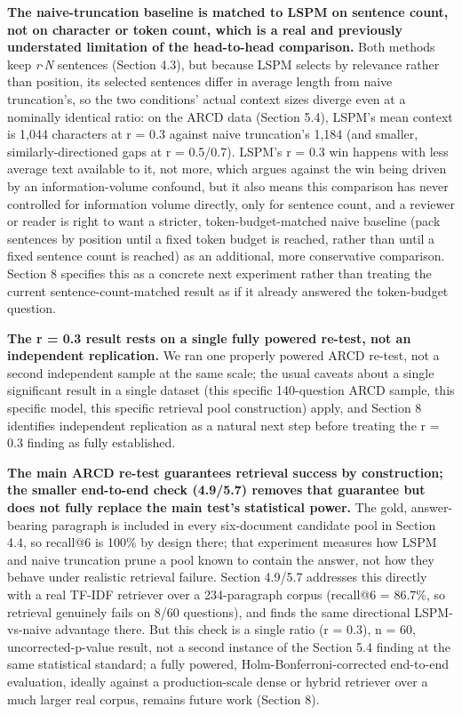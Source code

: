 \textbf{The naive-truncation baseline is matched to LSPM on sentence count, not on character or token count, which is a real and previously understated limitation of the head-to-head comparison.} Both methods keep \textit{r}$\cdot$\textit{N} sentences (Section 4.3), but because LSPM selects by relevance rather than position, its selected sentences differ in average length from naive truncation's, so the two conditions' actual context sizes diverge even at a nominally identical ratio: on the ARCD data (Section 5.4), LSPM's mean context is 1,044 characters at r = 0.3 against naive truncation's 1,184 (and smaller, similarly-directioned gaps at r = 0.5/0.7). LSPM's r = 0.3 win happens with less average text available to it, not more, which argues against the win being driven by an information-volume confound, but it also means this comparison has never controlled for information volume directly, only for sentence count, and a reviewer or reader is right to want a stricter, token-budget-matched naive baseline (pack sentences by position until a fixed token budget is reached, rather than until a fixed sentence count is reached) as an additional, more conservative comparison. Section 8 specifies this as a concrete next experiment rather than treating the current sentence-count-matched result as if it already answered the token-budget question.

\textbf{The r = 0.3 result rests on a single fully powered re-test, not an independent replication.} We ran one properly powered ARCD re-test, not a second independent sample at the same scale; the usual caveats about a single significant result in a single dataset (this specific 140-question ARCD sample, this specific model, this specific retrieval pool construction) apply, and Section 8 identifies independent replication as a natural next step before treating the r = 0.3 finding as fully established.

\textbf{The main ARCD re-test guarantees retrieval success by construction; the smaller end-to-end check (4.9/5.7) removes that guarantee but does not fully replace the main test's statistical power.} The gold, answer-bearing paragraph is included in every six-document candidate pool in Section 4.4, so recall@6 is 100\% by design there; that experiment measures how LSPM and naive truncation prune a pool known to contain the answer, not how they behave under realistic retrieval failure. Section 4.9/5.7 addresses this directly with a real TF-IDF retriever over a 234-paragraph corpus (recall@6 = 86.7\%, so retrieval genuinely fails on 8/60 questions), and finds the same directional LSPM-vs-naive advantage there. But this check is a single ratio (r = 0.3), n = 60, uncorrected-p-value result, not a second instance of the Section 5.4 finding at the same statistical standard; a fully powered, Holm-Bonferroni-corrected end-to-end evaluation, ideally against a production-scale dense or hybrid retriever over a much larger real corpus, remains future work (Section 8).

